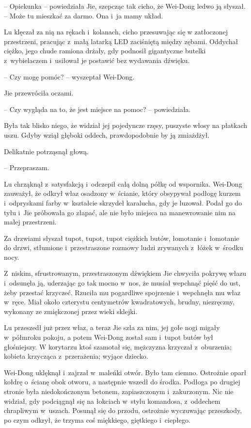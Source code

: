 \documentclass[oneside,polish,11pt,rmheadings]{mwbk}
\begin{document}
-- Opiekunka -- powiedziała Jie, szepcząc tak cicho, że Wei-Dong ledwo ją słyszał. -- Może tu mieszkać za darmo. Ona i~ja mamy układ. 

Lu klęczał za nią na rękach i~kolanach, cicho przesuwając się w zatłoczonej przestrzeni, pracując z~małą latarką LED zaciśniętą między zębami. Oddychał ciężko, jego chude ramiona drżały, gdy podnosił gigantyczne butelki z~wybielaczem i~usiłował je postawić bez wydawania dźwięku.

-- Czy mogę pomóc? -- wyszeptał Wei-Dong.

Jie przewróciła oczami. 

-- Czy wygląda na to, że jest miejsce na pomoc? -- powiedziała. 

Była tak blisko niego, że widział jej pojedyncze rzęsy, puszyste włosy na płatkach uszu. Gdyby wziął głęboki oddech, prawdopodobnie by ją zmiażdżył.

Delikatnie potrząsnął głową. 

-- Przepraszam. 

Lu chrząknął z~satysfakcją i~odczepił całą dolną półkę od wspornika. Wei-Dong zauważył, że odkrył właz osadzony w~ścianie, który obsypywał podłogę kurzem i~odpryskami farby w~kształcie skrzydeł karalucha, gdy je luzował. Podał go do tyłu i~Jie próbowała go złapać, ale nie było miejsca na manewrowanie nim na małej przestrzeni.

Za drzwiami słyszał tupot, tupot, tupot ciężkich butów, łomotanie i~łomotanie do drzwi, stłumione i~przestraszone rozmowy ludzi zrywanych z~łóżek w~środku nocy.

Z~niskim, sfrustrowanym, przestraszonym dźwiękiem Jie chwyciła pokrywę włazu i~odsunęła ją, uderzając go tak mocno w~nos, że musiał wepchnąć pięść do ust, żeby przestać krzyczeć. Rzuciła mu pogardliwe spojrzenie i~wepchnęła mu właz w~ręce. Miał około czterystu centymetrów kwadratowych, brudny, niezręczny, wykonany ze zmiękczonej przez wieki sklejki.

Lu przeszedł już przez właz, a teraz Jie szła za nim, jej gołe nogi migały w~półmroku pokoju, a potem Wei-Dong został sam i~tupot butów był głośniejszy. W korytarzu ktoś szamotał się, mężczyzna krzyczał z~oburzenia; kobieta krzycząca z~przerażenia; wyjące dziecko.

Wei-Dong uklęknął i~zajrzał w~maleńki otwór. Było tam ciemno. Ostrożnie oparł kołdrę o~ścianę obok otworu, a następnie wszedł do środka. Podłoga po drugiej stronie była niedokończonym betonem, zapiaszczonym i~zakurzonym. Nic nie widział, gdy podciągnął się na łokciach w~stylu komandosa, z~oddechem chrapliwym w~uszach. Posunął się do przodu, ostrożnie wyczuwając przeszkody, po czym odkrył, że trzyma coś miękkiego, giętkiego i~ciepłego. 
\end{document}
